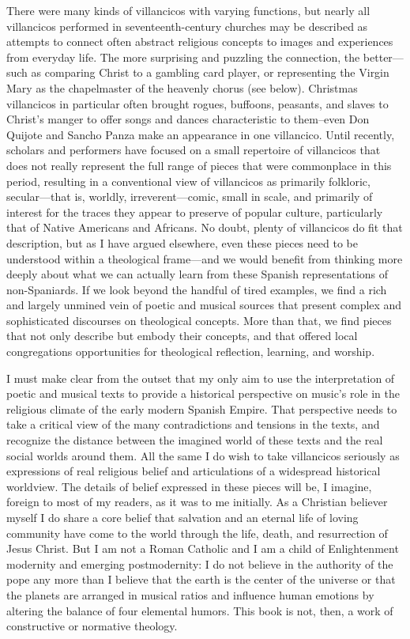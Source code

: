 There were many kinds of villancicos with varying functions, but nearly all
villancicos performed in seventeenth-century churches may be described as
attempts to connect often abstract religious concepts to images and experiences
from everyday life.
The more surprising and puzzling the connection, the better---such as comparing
Christ to a gambling card player, or representing the Virgin Mary as the
chapelmaster of the heavenly chorus (see below).%
    \Autocite{Cashner:PlayingCards}
Christmas villancicos in particular often brought rogues, buffoons, peasants,
and slaves to Christ's manger to offer songs and dances characteristic to
them--even Don Quijote and Sancho Panza make an appearance in one villancico.%
Until recently, scholars and performers have focused on a small repertoire of
villancicos that does not really represent the full range of pieces
that were commonplace in this period, resulting in a conventional view of
villancicos as primarily folkloric, secular---that is, worldly,
irreverent---comic, small in scale, and primarily of interest for the traces
they appear to preserve of popular culture, particularly that of Native
Americans and Africans.
No doubt, plenty of villancicos do fit that description, but as I have argued
elsewhere, even these pieces need to be understood within a theological
frame---and we would benefit from thinking more deeply about what we can
actually learn from these Spanish representations of non-Spaniards.%
    \Autocite{Cashner:BuildingSociety}
If we look beyond the handful of tired examples, we find a rich and largely
unmined vein of poetic and musical sources that present complex and
sophisticated discourses on theological concepts.
More than that, we find pieces that not only describe but embody their
concepts, and that offered local congregations opportunities for theological
reflection, learning, and worship.

I must make clear from the outset that my only aim to use the interpretation of
poetic and musical texts to provide a historical perspective on music's role in
the religious climate of the early modern Spanish Empire.
That perspective needs to take a critical view of the many contradictions and
tensions in the texts, and recognize the distance between the imagined world of
these texts and the real social worlds around them. 
All the same I do wish to take villancicos seriously as expressions of real
religious belief and articulations of a widespread historical worldview.
The details of belief expressed in these pieces will be, I imagine, foreign to
most of my readers, as it was to me initially.
As a Christian believer myself I do share a core belief that salvation and an 
eternal life of loving community have come to the world through the life,
death, and resurrection of Jesus Christ.
But I am not a Roman Catholic and I am a child of Enlightenment modernity and
emerging postmodernity: I do not believe in the authority of the pope any more
than I believe that the earth is the center of the universe or that the planets
are arranged in musical ratios and influence human emotions by altering the
balance of four elemental humors.
This book is not, then, a work of constructive or normative theology.

